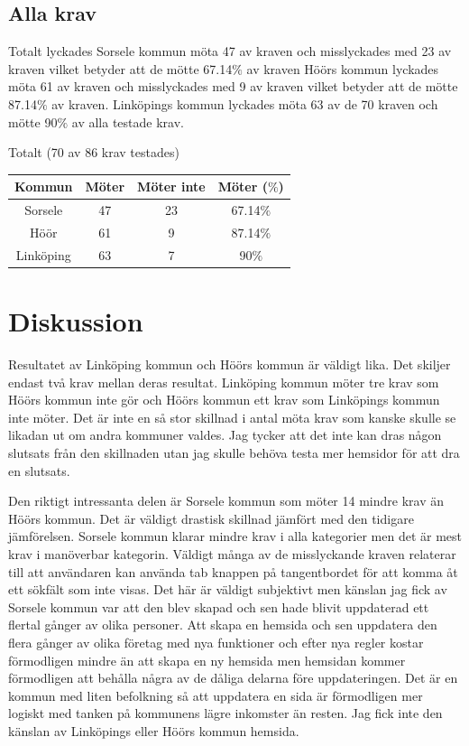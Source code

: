 \documentclass[11p]{article}
\begin{document}
    \subsection{Alla krav}
    Totalt lyckades Sorsele kommun möta 47 av kraven och misslyckades med 23 av kraven vilket betyder att de mötte 67.14$\%$ av kraven
    Höörs kommun lyckades möta 61 av kraven och misslyckades med 9 av kraven vilket betyder att de mötte 87.14$\%$ av kraven.
    Linköpings kommun lyckades möta 63 av de 70 kraven och mötte 90$\%$ av alla testade krav.

    \begin{center}
    Totalt (70 av 86 krav testades)

    \begin{tabular}{ |c|c|c|c|}
        \hline
        Kommun & Möter & Möter inte & Möter ($\%$) \\  \hline
        Sorsele & 47 & 23 & 67.14$\%$ \\ \hline
        Höör & 61 & 9 & 87.14$\%$ \\ \hline
        Linköping & 63 & 7 & 90$\%$ \\ \hline
    \end{tabular}
    \end{center}

    \section{Diskussion}
    Resultatet av Linköping kommun och Höörs kommun är väldigt lika.
    Det skiljer endast två krav mellan deras resultat.
    Linköping kommun möter tre krav som Höörs kommun inte gör och Höörs kommun ett krav som Linköpings kommun inte möter.
    Det är inte en så stor skillnad i antal möta krav som kanske skulle se likadan ut om andra kommuner valdes.
    Jag tycker att det inte kan dras någon slutsats från den skillnaden utan jag skulle behöva testa mer hemsidor för att dra en slutsats.

    Den riktigt intressanta delen är Sorsele kommun som möter 14 mindre krav än Höörs kommun.
    Det är väldigt drastisk skillnad jämfört med den tidigare jämförelsen.
    Sorsele kommun klarar mindre krav i alla kategorier men det är mest krav i manöverbar kategorin.
    Väldigt många av de misslyckande kraven relaterar till att användaren kan använda tab knappen på tangentbordet för att komma åt ett sökfält som inte visas.
    Det här är väldigt subjektivt men känslan jag fick av Sorsele kommun var att den blev skapad och sen hade blivit uppdaterad ett flertal gånger av olika personer.
    Att skapa en hemsida och sen uppdatera den flera gånger av olika företag med nya funktioner och efter nya regler kostar förmodligen mindre än att skapa en ny hemsida men hemsidan kommer förmodligen att behålla några av de dåliga delarna före uppdateringen.
    Det är en kommun med liten befolkning så att uppdatera en sida är förmodligen mer logiskt med tanken på kommunens lägre inkomster än resten.
    Jag fick inte den känslan av Linköpings eller Höörs kommun hemsida.
\end{document}
